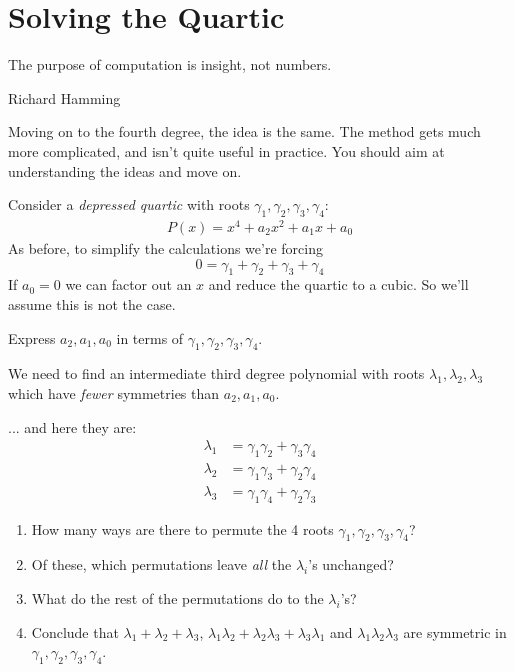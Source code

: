 \section{Solving the Quartic}
\epigraph{The purpose of computation is insight, not numbers.}{Richard Hamming}

Moving on to the fourth degree, the idea is the same. The method gets much more complicated, and isn't quite useful in practice. You should aim at understanding the ideas and move on.

Consider a \emph{depressed quartic} with roots $ \gamma_1, \gamma_2, \gamma_3, \gamma_4$: 
\begin{align*}
  P(x) = x^4 + a_2 x^2 + a_1 x + a_0
\end{align*}
As before, to simplify the calculations we're forcing $$ 0 =\gamma_1+ \gamma_2+ \gamma_3+ \gamma_4$$
If $ a_0 = 0$ we can factor out an $ x$ and reduce the quartic to a cubic. So we'll assume this is not the case.
\begin{questions}
  \item Express $ a_2, a_1, a_0$ in terms of $ \gamma_1, \gamma_2, \gamma_3, \gamma_4$.
\end{questions}
We need to find an intermediate third degree polynomial with roots $ \lambda_1, \lambda_2, \lambda_3$ which have \emph{fewer} symmetries than $ a_2, a_1, a_0$.

... and here they are: 
  \begin{align*}
    \lambda_1 &= \gamma_1 \gamma_2 + \gamma_3 \gamma_4 \\
    \lambda_2 &= \gamma_1 \gamma_3 + \gamma_2 \gamma_4 \\
    \lambda_3 &= \gamma_1 \gamma_4 + \gamma_2 \gamma_3 
  \end{align*}
\begin{questions}[resume]
  \item \begin{enumerate}
    \item How many ways are there to permute the 4 roots $ \gamma_1, \gamma_2, \gamma_3, \gamma_4$?
    \item Of these, which permutations leave \emph{all} the $\lambda_i$'s unchanged?
    \item What do the rest of the permutations do to the $\lambda_i$'s?
    \item Conclude that $\lambda_1 + \lambda_2 + \lambda_3$, $\lambda_1\lambda_2 + \lambda_2\lambda_3 + \lambda_3\lambda_1$ and $\lambda_1 \lambda_2 \lambda_3$ are symmetric in $ \gamma_1, \gamma_2, \gamma_3, \gamma_4$.
  \end{enumerate}
\end{questions}


